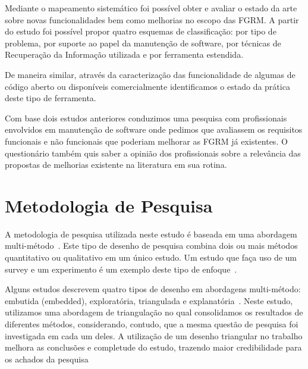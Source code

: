 Mediante o mapeamento sistemático foi possível obter e avaliar o estado da arte
sobre novas funcionalidades bem como melhorias no escopo das FGRM\@. A partir do
estudo foi possível propor quatro esquemas de classificação: por tipo de
problema, por suporte ao papel da manutenção de software, por técnicas de
Recuperação da Informação utilizada e por ferramenta estendida.

De maneira similar, através da caracterização das funcionalidade de algumas de
código aberto ou disponíveis comercialmente identificamos o estado da prática
deste tipo de ferramenta.

Com base dois estudos anteriores conduzimos uma pesquisa com
profissionais envolvidos em manutenção de software onde pedimos que avaliassem
os requisitos funcionais e não funcionais que poderiam melhorar as FGRM já
existentes. O questionário também quis saber a opinião dos profissionais sobre a
relevância das propostas de melhorias existente na literatura em sua
rotina.

\section{Metodologia de Pesquisa}
\label{sec:intro-metodologia}

A metodologia de pesquisa utilizada neste estudo é baseada em uma abordagem
multi-método~\cite{hesse2010mixed}. Este tipo de desenho de pesquisa combina
dois ou mais métodos quantitativo ou qualitativo em um único estudo. Um estudo
que faça uso de um survey e um experimento é um exemplo deste tipo de
enfoque~\cite{hesse2010mixed}.

Alguns estudos descrevem quatro tipos de desenho em abordagens multi-método:
embutida (embedded), exploratória, triangulada e
explanatória~\cite{creswell2007designing}. Neste estudo, utilizamos uma
abordagem de triangulação no qual consolidamos os resultados de diferentes
métodos, considerando, contudo, que a mesma questão de pesquisa foi investigada
em cada um deles. A utilização de um desenho triangular no trabalho melhora as
conclusões e completude do estudo, trazendo maior credibilidade para os achados
da pesquisa~\cite{hesse2010mixed}

